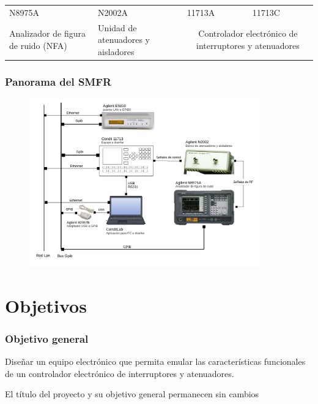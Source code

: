 \documentclass[xcolor=pdftext, table]{beamer}
\begin{document}
\begin{frame}
\begin{table}
\begin{tabular}{p{2.5cm}p{2.5cm}p{2.5cm}p{2.5cm}}
				{N8975A} &
				{N2002A} &									
				{11713A} &
				{11713C} \\
				
				{Analizador de figura de ruido (NFA)} &
				{Unidad de atenuadores y aisladores} &	
				
				\multicolumn{2}{c}{Controlador electrónico de interruptores y atenuadores} \\
				
			\end{tabular}
		\end{table}	
	\end{frame}
	

	\begin{frame}
		\frametitle{Panorama del SMFR}			
	
		\begin{figure}
			\begin{center}
				\includegraphics[width=10cm]{Imagenes/DiagramaBloquesSistema.pdf}
			\end{center}
		\end{figure}	
	
	\end{frame}
	
	\section{Objetivos} 
	
	
	\begin{frame}
		\frametitle{Objetivo general}		
		
		\begin{block}{}
			\centering
			Diseñar un equipo electrónico que permita emular las características funcionales de un controlador electrónico de interruptores y atenuadores.
		\end{block}
		
		\begin{center}			
			\small 
			 El título del proyecto y su objetivo general permanecen sin cambios
		\end{center}
		
	\end{frame}
	
\end{document}
